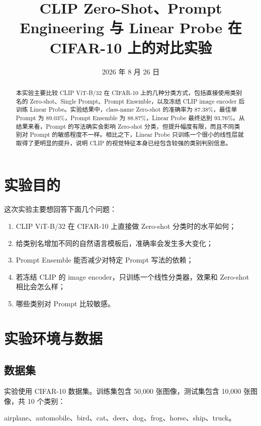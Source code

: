 \documentclass[UTF8,11pt,a4paper]{ctexart}
\title{\textbf{CLIP Zero-Shot、Prompt Engineering 与 Linear Probe 在 CIFAR-10 上的对比实验}}
\author{}
\date{2026 年 8 月 26 日}
\begin{document}
\maketitle

\begin{abstract}
本实验主要比较 CLIP ViT-B/32 在 CIFAR-10 上的几种分类方式，包括直接使用类别名的 Zero-shot、Single Prompt、Prompt Ensemble，以及冻结 CLIP image encoder 后训练 Linear Probe。实验结果中，class-name Zero-shot 的准确率为 87.38\%，最佳单 Prompt 为 89.03\%，Prompt Ensemble 为 88.87\%，Linear Probe 最终达到 93.76\%。从结果来看，Prompt 的写法确实会影响 Zero-shot 分类，但提升幅度有限，而且不同类别对 Prompt 的敏感程度不一样。相比之下，Linear Probe 只训练一个很小的线性层就取得了更明显的提升，说明 CLIP 的视觉特征本身已经包含较强的类别判别信息。
\end{abstract}

\section{实验目的}

这次实验主要想回答下面几个问题：

\begin{enumerate}[leftmargin=2.3em]
    \item CLIP ViT-B/32 在 CIFAR-10 上直接做 Zero-shot 分类时的水平如何；
    \item 给类别名增加不同的自然语言模板后，准确率会发生多大变化；
    \item Prompt Ensemble 能否减少对特定 Prompt 写法的依赖；
    \item 若冻结 CLIP 的 image encoder，只训练一个线性分类器，效果和 Zero-shot 相比会怎么样；
    \item 哪些类别对 Prompt 比较敏感。
\end{enumerate}

\section{实验环境与数据}

\subsection{数据集}

实验使用 CIFAR-10 数据集。训练集包含 50,000 张图像，测试集包含 10,000 张图像，共 10 个类别：

\begin{center}
airplane、automobile、bird、cat、deer、dog、frog、horse、ship、truck。
\end{center}
\end{document}

